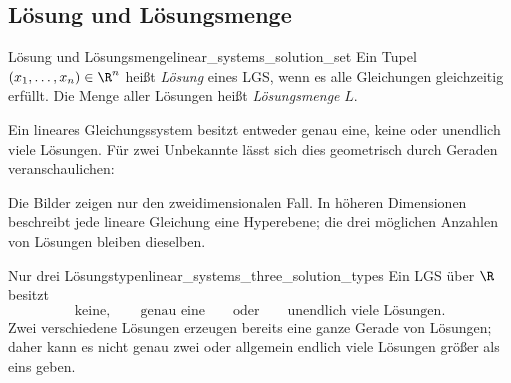 \subsection{Lösung und Lösungsmenge}
\label{subsec:linear_systems_solution_sets_and_geometry}

\begin{DefinitionBox}{Lösung und Lösungsmenge}{linear_systems_solution_set}
  Ein Tupel $(x_1,\dots,x_n)\in\R^n$ heißt \emph{Lösung} eines LGS, wenn es
  alle Gleichungen gleichzeitig erfüllt. Die Menge aller Lösungen heißt
  \emph{Lösungsmenge} $L$.
\end{DefinitionBox}

Ein lineares Gleichungssystem besitzt entweder genau eine, keine oder
unendlich viele Lösungen. Für zwei Unbekannte lässt sich dies geometrisch
durch Geraden veranschaulichen:

\begin{center}
  
\end{center}

Die Bilder zeigen nur den zweidimensionalen Fall. In höheren Dimensionen
beschreibt jede lineare Gleichung eine Hyperebene; die drei möglichen Anzahlen
von Lösungen bleiben dieselben.

\begin{KeyPointBox}{Nur drei Lösungstypen}{linear_systems_three_solution_types}
  Ein LGS über $\R$ besitzt
  \[
    \boxed{\text{keine}},\qquad
    \boxed{\text{genau eine}}
    \qquad\text{oder}\qquad
    \boxed{\text{unendlich viele Lösungen}}.
  \]
  Zwei verschiedene Lösungen erzeugen bereits eine ganze Gerade von Lösungen;
  daher kann es nicht genau zwei oder allgemein endlich viele Lösungen größer
  als eins geben.
\end{KeyPointBox}
